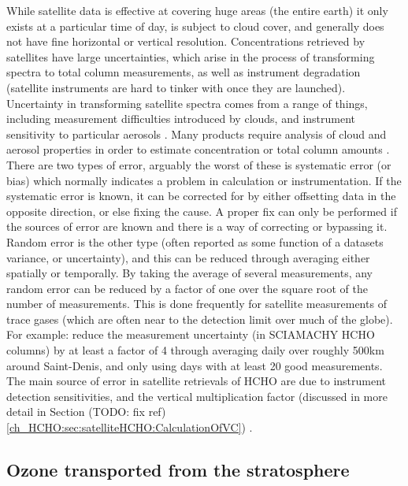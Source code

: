       While satellite data is effective at covering huge areas (the entire earth) it only exists at a particular time of day, is subject to cloud cover, and generally does not have fine horizontal or vertical resolution.
      Concentrations retrieved by satellites have large uncertainties, which arise in the process of transforming spectra to total column measurements, as well as instrument degradation (satellite instruments are hard to tinker with once they are launched).
      Uncertainty in transforming satellite spectra comes from a range of things, including measurement difficulties introduced by clouds, and instrument sensitivity to particular aerosols \citep{Millet2006}.
      Many products require analysis of cloud and aerosol properties in order to estimate concentration or total column amounts \citep{Palmer2001,Palmer2003, Marais2012, Vasilkov2017}.
      There are two types of error, arguably the worst of these is systematic error (or bias) which normally indicates a problem in calculation or instrumentation.
      If the systematic error is known, it can be corrected for by either offsetting data in the opposite direction, or else fixing the cause.
      A proper fix can only be performed if the sources of error are known and there is a way of correcting or bypassing it.
      Random error is the other type (often reported as some function of a datasets variance, or uncertainty), and this can be reduced through averaging either spatially or temporally. 
      By taking the average of several measurements, any random error can be reduced by a factor of one over the square root of the number of measurements.
      This is done frequently for satellite measurements of trace gases (which are often near to the detection limit over much of the globe).
      For example: \citet{Vigouroux2009} reduce the measurement uncertainty (in SCIAMACHY HCHO columns) by at least a factor of 4 through averaging daily over roughly 500km around Saint-Denis, and only using days with at least 20 good measurements.
      The main source of error in satellite retrievals of HCHO are due to instrument detection sensitivities, and the vertical multiplication factor (discussed in more detail in Section (TODO: fix ref)\ref{ch_HCHO:sec:satelliteHCHO:CalculationOfVC}) \citep{Millet2006}.
      
  \subsection{Ozone transported from the stratosphere}
    
